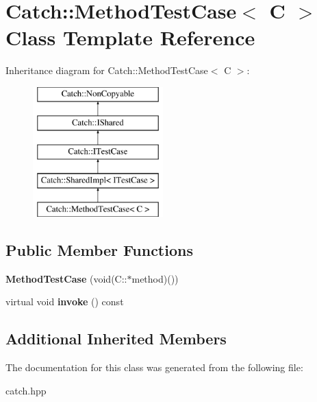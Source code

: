 \hypertarget{classCatch_1_1MethodTestCase}{}\section{Catch\+:\+:Method\+Test\+Case$<$ C $>$ Class Template Reference}
\label{classCatch_1_1MethodTestCase}
Inheritance diagram for Catch\+:\+:Method\+Test\+Case$<$ C $>$\+:\begin{figure}[H]
\begin{center}
\leavevmode
\includegraphics[height=5.000000cm]{classCatch_1_1MethodTestCase}
\end{center}
\end{figure}
\subsection*{Public Member Functions}
\begin{DoxyCompactItemize}
\item 
\mbox{\label{classCatch_1_1MethodTestCase_a7b043b85dae371358255dd9dc6582e7b}} 
{\bfseries Method\+Test\+Case} (void(C\+::$\ast$method)())
\item 
\mbox{\label{classCatch_1_1MethodTestCase_a4e2263cfa0646f2980768328cb372793}} 
virtual void {\bfseries invoke} () const
\end{DoxyCompactItemize}
\subsection*{Additional Inherited Members}


The documentation for this class was generated from the following file\+:\begin{DoxyCompactItemize}
\item 
catch.\+hpp\end{DoxyCompactItemize}
